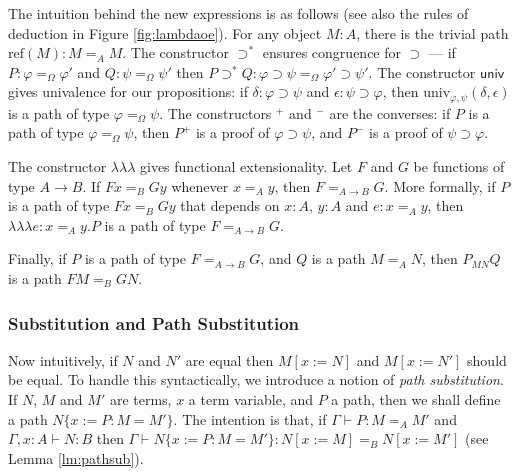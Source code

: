 \documentclass[a4paper,UKenglish]{lipics-v2016}
\newcommand*{\reff}[1]{\ensuremath{\mathrm{ref} \left( {#1} \right)}}
\newcommand*{\univ}[4]{\ensuremath{\mathrm{univ}_{{#1}, {#2}} \left({#3} , {#4} \right)}}
\newcommand*{\triplelambda}{\ensuremath{\lambda \!\! \lambda \!\! \lambda}}
\theoremstyle{plain}
\theoremstyle{definition}
\begin{document}
The intuition behind the new expressions is as follows (see also the rules of deduction in Figure \ref{fig:lambdaoe}).  For any object $M : A$, there is the trivial path $\reff{M} : M =_A M$.  The constructor $\supset^*$ ensures congruence for $\supset$ --- if $P : \varphi =_\Omega \varphi'$ and $Q : \psi =_\Omega \psi'$ then $P \supset^* Q : \varphi \supset \psi =_\Omega \varphi' \supset \psi'$.  The constructor $\mathsf{univ}$ gives univalence for our propositions: if $\delta : \varphi \supset \psi$ and $\epsilon : \psi \supset \varphi$, then $\univ{\varphi}{\psi}{\delta}{\epsilon}$ is a path of type $\varphi =_\Omega \psi$.  The constructors $^+$ and $^-$ are the converses: if $P$ is a path of type $\varphi =_\Omega \psi$, then $P^+$ is a proof of $\varphi \supset \psi$, and $P^-$ is a proof of $\psi \supset \varphi$.

The constructor $\triplelambda$ gives functional extensionality.  Let $F$ and $G$ be functions of type $A \rightarrow B$.  If $F x =_B G y$ whenever $x =_A y$, then $F =_{A \rightarrow B} G$.  More formally, if $P$ is a path of type $Fx =_B Gy$ that depends on $x : A$, $y : A$ and $e : x =_A y$, then $\triplelambda e : x =_A y . P$ is a path of type $F =_{A \rightarrow B} G$.

Finally, if $P$ is a path of type $F =_{A \rightarrow B} G$, and $Q$ is a path $M =_A N$, then $P_{MN} Q$ is a path $FM =_B G N$.

\subsubsection{Substitution and Path Substitution}

Now intuitively, if $N$ and $N'$ are equal then $M[x:=N]$ and $M[x:=N']$ should be equal.  To handle this syntactically,
we introduce a notion of \emph{path substitution}.  If $N$, $M$ and $M'$ are terms, $x$ a term variable, and $P$ a path, then we shall define a path $N \{ x := P : M = M' \}$.  The intention is that, if
$\Gamma \vdash P : M =_A M'$ and $\Gamma, x : A \vdash N : B$ then $\Gamma \vdash N \{ x := P : M = M' \} : N [ x:= M ] =_B N [ x := M' ]$ (see Lemma \ref{lm:pathsub}). 
\end{document}
